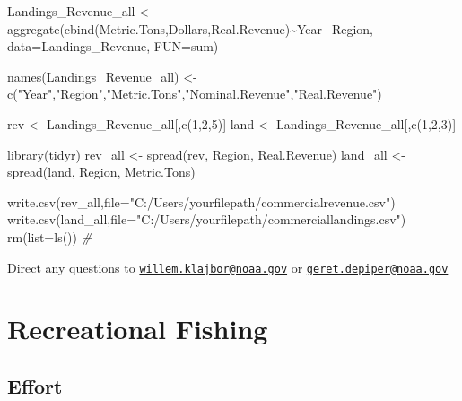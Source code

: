 \documentclass[
]{book}
\newenvironment{Shaded}{\begin{snugshade}}{\end{snugshade}}
\newcommand{\AttributeTok}[1]{\textcolor[rgb]{0.77,0.63,0.00}{#1}}
\newcommand{\CommentTok}[1]{\textcolor[rgb]{0.56,0.35,0.01}{\textit{#1}}}
\newcommand{\DecValTok}[1]{\textcolor[rgb]{0.00,0.00,0.81}{#1}}
\newcommand{\FunctionTok}[1]{\textcolor[rgb]{0.00,0.00,0.00}{#1}}
\newcommand{\NormalTok}[1]{#1}
\newcommand{\OtherTok}[1]{\textcolor[rgb]{0.56,0.35,0.01}{#1}}
\newcommand{\SpecialCharTok}[1]{\textcolor[rgb]{0.00,0.00,0.00}{#1}}
\newcommand{\StringTok}[1]{\textcolor[rgb]{0.31,0.60,0.02}{#1}}
\begin{document}
\begin{Shaded}
\begin{Highlighting}[]
\NormalTok{Landings\_Revenue\_all }\OtherTok{\textless{}{-}} \FunctionTok{aggregate}\NormalTok{(}\FunctionTok{cbind}\NormalTok{(Metric.Tons,Dollars,Real.Revenue)}\SpecialCharTok{\textasciitilde{}}\NormalTok{Year}\SpecialCharTok{+}\NormalTok{Region, }\AttributeTok{data=}\NormalTok{Landings\_Revenue, }\AttributeTok{FUN=}\NormalTok{sum)}

\FunctionTok{names}\NormalTok{(Landings\_Revenue\_all) }\OtherTok{\textless{}{-}} \FunctionTok{c}\NormalTok{(}\StringTok{"Year"}\NormalTok{,}\StringTok{"Region"}\NormalTok{,}\StringTok{"Metric.Tons"}\NormalTok{,}\StringTok{"Nominal.Revenue"}\NormalTok{,}\StringTok{"Real.Revenue"}\NormalTok{)}

\NormalTok{rev }\OtherTok{\textless{}{-}}\NormalTok{ Landings\_Revenue\_all[,}\FunctionTok{c}\NormalTok{(}\DecValTok{1}\NormalTok{,}\DecValTok{2}\NormalTok{,}\DecValTok{5}\NormalTok{)]}
\NormalTok{land }\OtherTok{\textless{}{-}}\NormalTok{ Landings\_Revenue\_all[,}\FunctionTok{c}\NormalTok{(}\DecValTok{1}\NormalTok{,}\DecValTok{2}\NormalTok{,}\DecValTok{3}\NormalTok{)]}

\FunctionTok{library}\NormalTok{(tidyr)}
\NormalTok{rev\_all }\OtherTok{\textless{}{-}} \FunctionTok{spread}\NormalTok{(rev, Region, Real.Revenue)}
\NormalTok{land\_all }\OtherTok{\textless{}{-}} \FunctionTok{spread}\NormalTok{(land, Region, Metric.Tons)}

\FunctionTok{write.csv}\NormalTok{(rev\_all,}\AttributeTok{file=}\StringTok{"C:/Users/yourfilepath/commercialrevenue.csv"}\NormalTok{)}
\FunctionTok{write.csv}\NormalTok{(land\_all,}\AttributeTok{file=}\StringTok{"C:/Users/yourfilepath/commerciallandings.csv"}\NormalTok{)}
\FunctionTok{rm}\NormalTok{(}\AttributeTok{list=}\FunctionTok{ls}\NormalTok{())}
\CommentTok{\#}
\end{Highlighting}
\end{Shaded}

Direct any questions to \href{mailto:willem.klajbor@noaa.gov}{\nolinkurl{willem.klajbor@noaa.gov}} or \href{mailto:geret.depiper@noaa.gov}{\nolinkurl{geret.depiper@noaa.gov}}

\hypertarget{recreational-fishing}{%
\chapter{Recreational Fishing}\label{recreational-fishing}}

\hypertarget{effort}{%
\section{Effort}\label{effort}}
\end{document}
